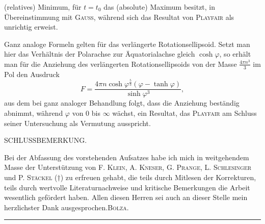(relatives) Minimum, für $t=t_0$ das (absolute) Maximum besitzt, in Übereinstimmung mit \textsc{Gauss}, während sich das Resultat von \textsc{Playfair} als unrichtig
erweist.
\par\noindent\hspace*{\parindent}Ganz analoge Formeln gelten für das verlängerte Rotationsellipsoid. Setzt
man hier das Verhältnis der Polarachse zur Äquatorialachse gleich $\cosh\varphi$, so
erhält man für die Anziehung des verlängerten Rotationsellipsoids von der
\clearpage{}
\noindent Masse $\frac{4\pi n^3}3$ im Pol den Ausdruck
\[
F=\frac{4\pi n\cosh\varphi^{\frac53}(\varphi-\tanh\varphi)}{\sinh\varphi^3},
\]
aus dem bei ganz analoger Behandlung folgt, dass die Anziehung beständig
abnimmt, während $\varphi$ von $0$ bis $\infty$ wächst, ein Resultat, das \textsc{Playfair} am
Schluss seiner Untersuchung als Vermutung ausspricht.
\begin{center}\small SCHLUSSBEMERKUNG.\end{center}
{\small\noindent\hspace*{\parindent}Bei der Abfassung des vorstehenden Aufsatzes habe ich mich in weitgehendem Masse der Unterstützung von F. \textsc{Klein}, A. \textsc{Kneser}, G. \textsc{Prange}, L. \textsc{Schlesinger} und P. \textsc{Stäckel} ($\dagger$) zu erfreuen gehabt,
die teils durch Mitlesen der Korrekturen, teils durch wertvolle Literaturnachweise und kritische Bemerkungen
die Arbeit wesentlich gefördert haben. Allen diesen Herren sei auch an dieser Stelle mein herzlichster Dank
ausgesprochen.\hfill\textsc{Bolza}.\par}
\begin{center}\rule{3.5cm}{.25pt}\end{center}
\clearpage\endgroup
